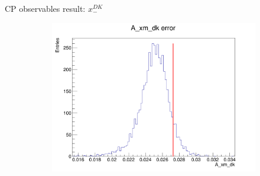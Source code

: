 \documentclass{beamer}
\begin{document}
\begin{frame}{CP observables result: $x_-^{DK}$}
\begin{figure}
\begin{subfigure}{0.42\textwidth}
      \includegraphics[width = 1.0\textwidth]{Plots/A_xm_dk_error_WithDataUncertainty.png}
    \end{subfigure}
  \end{figure}
\end{frame}
\end{document}
